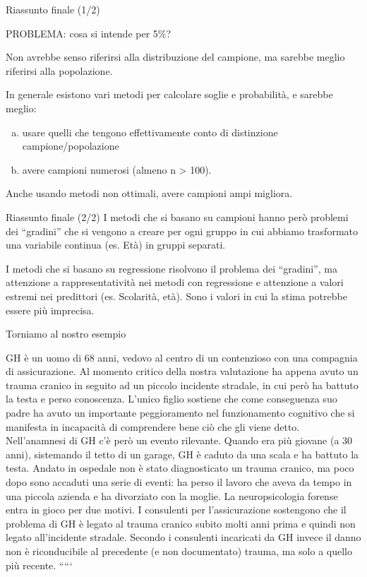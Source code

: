 \documentclass[
  ignorenonframetext,
  aspectratio=169,
]{beamer}
\begin{document}
\begin{frame}{Riassunto finale (1/2)}
\label{riassunto-finale-12-1}
\begin{center}
PROBLEMA: cosa si intende per 5\%? 
\end{center}

Non avrebbe senso riferirsi alla distribuzione del campione, ma sarebbe
meglio riferirsi alla popolazione.

In generale esistono vari metodi per calcolare soglie e probabilità, e
sarebbe meglio:

\begin{enumerate}
[a)]
\item
  usare quelli che tengono effettivamente conto di distinzione
  campione/popolazione
\item
  avere campioni numerosi (almeno n \textgreater{} 100).
\end{enumerate}

Anche usando metodi non ottimali, avere campioni ampi migliora.
\end{frame}

\begin{frame}{Riassunto finale (2/2)}
\label{riassunto-finale-22}
I metodi che si basano su campioni hanno però problemi dei ``gradini''
che si vengono a creare per ogni gruppo in cui abbiamo trasformato una
variabile continua (es. Età) in gruppi separati.

I metodi che si basano su regressione risolvono il problema dei
``gradini'', ma attenzione a rappresentatività nei metodi con
regressione e attenzione a valori estremi nei predittori (es. Scolarità,
età). Sono i valori in cui la stima potrebbe essere più imprecisa.
\end{frame}

\begin{frame}{Torniamo al nostro esempio}
\label{torniamo-al-nostro-esempio}
\scriptsize

GH è un uomo di 68 anni, vedovo al centro di un contenzioso con una
compagnia di assicurazione. Al momento critico della nostra valutazione
ha appena avuto un trauma cranico in seguito ad un piccolo incidente
stradale, in cui però ha battuto la testa e perso conoscenza. L'unico
figlio sostiene che come conseguenza suo padre ha avuto un importante
peggioramento nel funzionamento cognitivo che si manifesta in incapacità
di comprendere bene ciò che gli viene detto. Nell'anamnesi di GH c'è
però un evento rilevante. Quando era più giovane (a 30 anni), sistemando
il tetto di un garage, GH è caduto da una scala e ha battuto la testa.
Andato in ospedale non è stato diagnosticato un trauma cranico, ma poco
dopo sono accaduti una serie di eventi: ha perso il lavoro che aveva da
tempo in una piccola azienda e ha divorziato con la moglie. La
neuropsicologia forense entra in gioco per due motivi. I consulenti per
l'assicurazione sostengono che il problema di GH è legato al trauma
cranico subito molti anni prima e quindi non legato all'incidente
stradale. Secondo i consulenti incaricati da GH invece il danno non è
riconducibile al precedente (e non documentato) trauma, ma solo a quello
più recente. `````
\end{frame}
\end{document}
